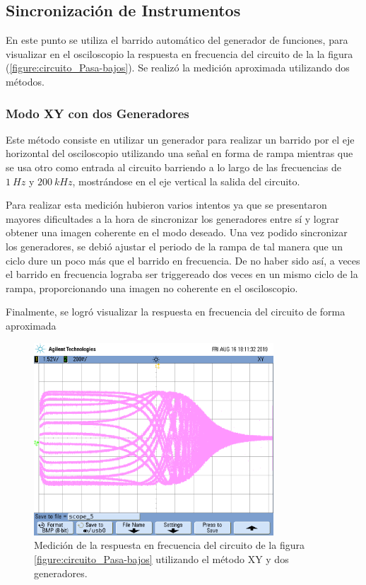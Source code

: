 \documentclass[a4paper]{article}
\begin{document}
\subsection*{Sincronización de Instrumentos}
En este punto se utiliza el barrido automático del generador de funciones, para visualizar en el osciloscopio la respuesta en frecuencia del circuito de la la figura (\ref{figure:circuito_Pasa-bajos}). Se realizó la medición aproximada utilizando dos métodos.

\subsubsection*{Modo XY con dos Generadores}
Este método consiste en utilizar un generador para realizar un barrido por el eje horizontal del osciloscopio utilizando una señal en forma de rampa mientras que se usa otro como entrada al circuito barriendo a lo largo de las frecuencias de $1 \ Hz$ y $200 \ kHz$, mostrándose en el eje vertical la salida del circuito.

Para realizar esta medición hubieron varios intentos ya que se presentaron mayores dificultades a la hora de sincronizar los generadores entre sí y lograr obtener una imagen coherente en el modo deseado. Una vez podido sincronizar los generadores, se debió ajustar el periodo de la rampa de tal manera que un ciclo dure un poco más que el barrido en frecuencia. De no haber sido así, a veces el barrido en frecuencia lograba ser triggereado dos veces en un mismo ciclo de la rampa, proporcionando una imagen no coherente en el osciloscopio.

Finalmente, se logró visualizar la respuesta en frecuencia del circuito de forma aproximada

\begin{figure}[H]
	\centering
	\includegraphics[width=0.8\textwidth,trim={0.5cm 5cm  1 5cm},clip]{ej3xy.png}
	\caption{Medición de la respuesta en frecuencia del circuito de la figura \ref{figure:circuito_Pasa-bajos} utilizando el método XY y dos generadores.} 
	\label{graf:osci_freq_alta}
\end{figure}
\end{document}
